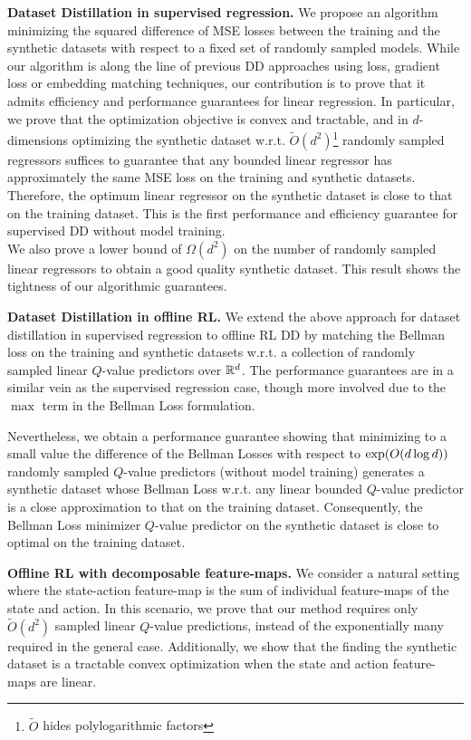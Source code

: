 {\bf Dataset Distillation in supervised regression.} We propose an algorithm minimizing the squared difference of MSE losses between the training and the synthetic datasets with respect to a fixed set of randomly sampled models.  While our algorithm is along the line of previous DD approaches using loss, gradient loss or embedding matching techniques, our contribution is to prove that it  admits  efficiency and performance guarantees for linear regression. In particular, we prove that the optimization objective is convex and tractable, and in $d$-dimensions optimizing the synthetic dataset w.r.t. $\tilde{O}(d^2)$\footnote{$\tilde{O}$ hides polylogarithmic factors} randomly sampled regressors suffices to guarantee that any bounded linear regressor has approximately the same MSE loss on the training and synthetic datasets. Therefore, the optimum linear regressor on the synthetic dataset is close to that on the training dataset. This is the first performance and efficiency guarantee for supervised DD without model training. \\ 
We also prove a lower bound of $\Omega(d^2)$ on the number of randomly sampled linear regressors to obtain a good quality synthetic dataset. This result shows the tightness of our algorithmic guarantees.


{\bf Dataset Distillation in offline RL.} We extend the above approach for dataset distillation in supervised regression to offline RL DD by matching the Bellman loss on the training and synthetic datasets  w.r.t. a collection of randomly sampled linear $Q$-value predictors over $\mathbb{R}^d$. 
The performance guarantees are in a similar vein as the supervised regression case, though more involved due to the $\max$ term in the Bellman Loss formulation. 

Nevertheless, we obtain a performance guarantee showing that minimizing to a small value the difference of the Bellman Losses with respect to $\textnormal{exp}(O(d\log d))$ randomly sampled $Q$-value predictors (without model training) generates a synthetic dataset whose Bellman Loss w.r.t. any linear bounded $Q$-value predictor is a close approximation to that on the training dataset. Consequently, the Bellman Loss minimizer $Q$-value predictor on the synthetic dataset is close to optimal on the training dataset. 

{\bf Offline RL with decomposable feature-maps.} 
We consider a natural setting where the state-action feature-map is the sum of  individual feature-maps of the state and action. In this scenario, we prove that our method requires only $\tilde{O}(d^2)$ sampled linear $Q$-value predictions, instead of the exponentially many required in the general case. Additionally, we show that the finding the synthetic dataset is a tractable convex optimization when the state and action feature-maps are linear.



